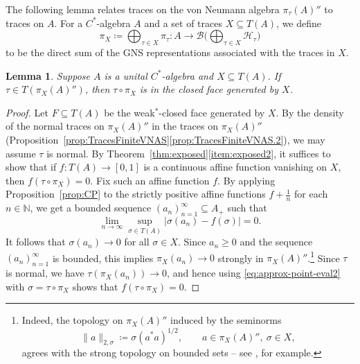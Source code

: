 \documentclass[a4paper,11pt]{amsart}
\newtheorem{lemma}[theorem]{Lemma}
\theoremstyle{definition}
\numberwithin{equation}{section}
\numberwithin{theorem}{section}
\begin{document}
The following lemma relates traces on the von Neumann algebra $\pi_\tau(A)''$ to traces on $A$.  For a $C^*$-algebra $A$ and a set of traces $X \subseteq T(A)$, we define
\begin{equation}\label{eq:GNS-X}
	\pi_X \coloneqq \bigoplus_{\tau \in X} \pi_\tau \colon A \rightarrow \mathcal{B}\Big( \bigoplus_{\tau \in X} \mathcal H_\tau \Big)
\end{equation}
to be the direct sum of the GNS representations associated with the traces in $X$.

\begin{lemma}\label{lem:GNSTraceFace}
	Suppose $A$ is a unital $C^*$-algebra and $X \subseteq T(A)$.  If $\tau \in T(\pi_X(A)'')$, then $\tau \circ \pi_X$ is in the closed face generated by $X$.
\end{lemma}

\begin{proof}
Let $F \subseteq T(A)$ be the weak$^*$-closed face generated by $X$. By the density of the normal traces on $\pi_X(A)''$ in the traces on $\pi_X(A)''$ (Proposition~\ref{prop:TracesFiniteVNAS}\ref{prop:TracesFiniteVNAS.2}), we may assume $\tau$ is normal.
	  By Theorem~\ref{thm:exposed}\ref{item:exposed2}, it suffices to show that if $f \colon T(A) \rightarrow [0, 1]$ is a continuous affine function vanishing on $X$, then $f(\tau \circ \pi_X) = 0$.  
	  Fix such an affine function $f$.  
	  By applying Proposition~\ref{prop:CP} to the strictly positive affine functions $f + \tfrac{1}{n}$ for each $n \in \mathbb{N}$, we get a bounded sequence $(a_n)_{n=1}^\infty \subseteq A_+$ such that
	\begin{equation}\label{eq:approx-point-eval2}
		\lim_{n\to\infty} \sup_{\sigma \in T(A)} | \sigma(a_n)-f(\sigma)| = 0.
	\end{equation}
	It follows that $\sigma(a_n) \rightarrow 0$ for all $\sigma \in X$.  
	Since $a_n \geq 0$ and the sequence $(a_n)_{n=1}^\infty$ is bounded, this implies $\pi_X(a_n) \rightarrow 0$ strongly in $\pi_X(A)''$.\footnote{Indeed, the topology on $\pi_X(A)''$ induced by the seminorms 
		\[\|a\|_{2, \sigma} \coloneqq \sigma(a^*a)^{1/2}, \qquad  a \in \pi_X(A)'',\ \sigma \in X, \] agrees with the strong topology on bounded sets -- see \cite[Proposition~III.2.2.19]{Bl06}, for example.}
	Since $\tau$ is normal, we have $\tau(\pi_X(a_n)) \rightarrow 0$, and hence using \eqref{eq:approx-point-eval2} with $\sigma=\tau\circ\pi_X$ shows that $f(\tau\circ \pi_X) = 0$.
\end{proof}
\end{document}
